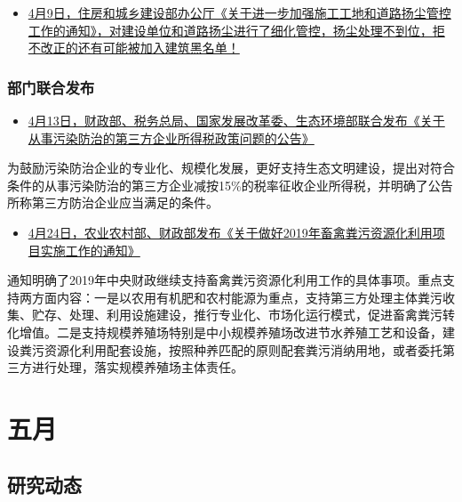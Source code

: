 \documentclass[]{book}
\providecommand{\tightlist}{%
  \setlength{\itemsep}{0pt}\setlength{\parskip}{0pt}}
\begin{document}
\begin{itemize}
\tightlist
\item
  \href{http://www.mohurd.gov.cn/wjfb/201904/t20190415_240200.html}{4月9日，住房和城乡建设部办公厅《关于进一步加强施工工地和道路扬尘管控工作的通知》，对建设单位和道路扬尘进行了细化管控，扬尘处理不到位，拒不改正的还有可能被加入建筑黑名单！}
\end{itemize}

\hypertarget{ux90e8ux95e8ux8054ux5408ux53d1ux5e03-5}{%
\subsubsection*{部门联合发布}\label{ux90e8ux95e8ux8054ux5408ux53d1ux5e03-5}}

\begin{itemize}
\tightlist
\item
  \href{http://szs.mof.gov.cn/zhengwuxinxi/zhengcefabu/201904/t20190425_3234504.html}{4月13日，财政部、税务总局、国家发展改革委、生态环境部联合发布《关于从事污染防治的第三方企业所得税政策问题的公告》}
\end{itemize}

为鼓励污染防治企业的专业化、规模化发展，更好支持生态文明建设，提出对符合条件的从事污染防治的第三方企业减按15\%的税率征收企业所得税，并明确了公告所称第三方防治企业应当满足的条件。

\begin{itemize}
\tightlist
\item
  \href{http://www.moa.gov.cn/govpublic/SYJ/201904/t20190426_6212935.htm}{4月24日，农业农村部、财政部发布《关于做好2019年畜禽粪污资源化利用项目实施工作的通知》}
\end{itemize}

通知明确了2019年中央财政继续支持畜禽粪污资源化利用工作的具体事项。重点支持两方面内容：一是以农用有机肥和农村能源为重点，支持第三方处理主体粪污收集、贮存、处理、利用设施建设，推行专业化、市场化运行模式，促进畜禽粪污转化增值。二是支持规模养殖场特别是中小规模养殖场改进节水养殖工艺和设备，建设粪污资源化利用配套设施，按照种养匹配的原则配套粪污消纳用地，或者委托第三方进行处理，落实规模养殖场主体责任。

\hypertarget{ux4e94ux6708-1}{%
\section*{五月}\label{ux4e94ux6708-1}}

\hypertarget{ux7814ux7a76ux52a8ux6001-18}{%
\subsection*{研究动态}\label{ux7814ux7a76ux52a8ux6001-18}}
\end{document}
